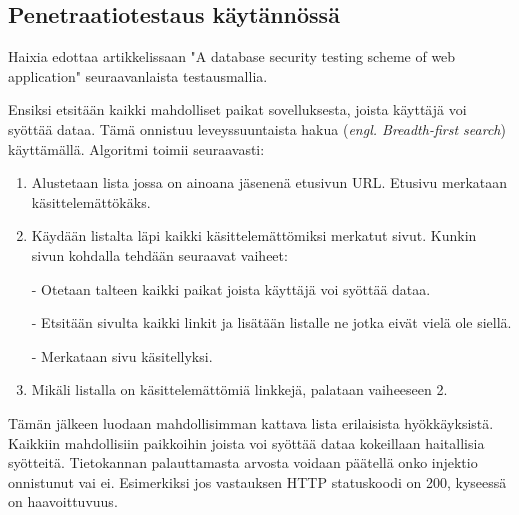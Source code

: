 \documentclass[finnish]{tktltiki2}
\theoremstyle{definition}
\theoremstyle{remark}
\begin{document}
	\subsection{Penetraatiotestaus käytännössä}
	 Haixia edottaa artikkelissaan "A database security testing scheme of web application" \cite{testing} seuraavanlaista testausmallia.
	
	Ensiksi etsitään kaikki mahdolliset paikat sovelluksesta, joista käyttäjä voi syöttää dataa. Tämä onnistuu leveyssuuntaista hakua (\textit{engl. Breadth-first search}) käyttämällä. Algoritmi toimii seuraavasti:
	\begin{enumerate}
		\item Alustetaan lista jossa on ainoana jäsenenä etusivun URL. Etusivu merkataan käsittelemättökäks.
		
		\item Käydään listalta läpi kaikki käsittelemättömiksi merkatut sivut. Kunkin sivun kohdalla tehdään seuraavat vaiheet:
		
		- Otetaan talteen kaikki paikat joista käyttäjä voi syöttää dataa.
		
		- Etsitään sivulta kaikki linkit ja lisätään listalle ne jotka eivät vielä ole siellä.
		
		- Merkataan sivu käsitellyksi.
		
		\item Mikäli listalla on käsittelemättömiä linkkejä, palataan vaiheeseen 2.
	\end{enumerate}
	
	Tämän jälkeen luodaan mahdollisimman kattava lista erilaisista hyökkäyksistä. Kaikkiin mahdollisiin paikkoihin joista voi syöttää dataa kokeillaan haitallisia syötteitä. Tietokannan palauttamasta arvosta voidaan päätellä onko injektio onnistunut vai ei. Esimerkiksi jos vastauksen HTTP statuskoodi on 200, kyseessä on haavoittuvuus.
	
\end{document}
